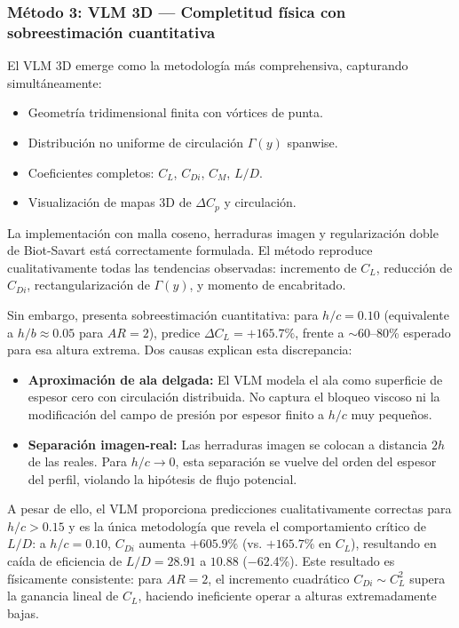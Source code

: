 \documentclass[twocolumn]{article}
\begin{document}
\subsubsection{Método 3: VLM 3D --- Completitud física con sobreestimación cuantitativa}

El VLM 3D emerge como la metodología más comprehensiva, capturando simultáneamente:

\begin{itemize}
    \item Geometría tridimensional finita con vórtices de punta.
    \item Distribución no uniforme de circulación $\Gamma(y)$ spanwise.
    \item Coeficientes completos: $C_L$, $C_{Di}$, $C_M$, $L/D$.
    \item Visualización de mapas 3D de $\Delta C_p$ y circulación.
\end{itemize}

La implementación con malla coseno, herraduras imagen y regularización doble de Biot-Savart está correctamente formulada. El método reproduce cualitativamente todas las tendencias observadas: incremento de $C_L$, reducción de $C_{Di}$, rectangularización de $\Gamma(y)$, y momento de encabritado.

Sin embargo, presenta sobreestimación cuantitativa: para $h/c = 0.10$ (equivalente a $h/b \approx 0.05$ para $AR = 2$), predice $\Delta C_L = +165.7\%$, frente a $\sim 60$--80\% esperado para esa altura extrema. Dos causas explican esta discrepancia:

\begin{itemize}
    \item \textbf{Aproximación de ala delgada:} El VLM modela el ala como superficie de espesor cero con circulación distribuida. No captura el bloqueo viscoso ni la modificación del campo de presión por espesor finito a $h/c$ muy pequeños.
    \item \textbf{Separación imagen-real:} Las herraduras imagen se colocan a distancia $2h$ de las reales. Para $h/c \to 0$, esta separación se vuelve del orden del espesor del perfil, violando la hipótesis de flujo potencial.
\end{itemize}

A pesar de ello, el VLM proporciona predicciones cualitativamente correctas para $h/c > 0.15$ y es la única metodología que revela el comportamiento crítico de $L/D$: a $h/c = 0.10$, $C_{Di}$ aumenta $+605.9\%$ (vs. $+165.7\%$ en $C_L$), resultando en caída de eficiencia de $L/D = 28.91$ a $10.88$ (−62.4\%). Este resultado es físicamente consistente: para $AR = 2$, el incremento cuadrático $C_{Di} \sim C_L^2$ supera la ganancia lineal de $C_L$, haciendo ineficiente operar a alturas extremadamente bajas.
\end{document}
